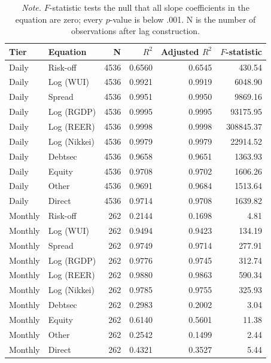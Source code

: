 \FloatBarrier
\begin{table}[H]
  \centering
  \caption{Per-Equation Fit Statistics, Restricted VAR, Paper Period}
  \label{tab:fit}
  \small
  \begin{tabular}{l l r r r r}
    \toprule
    Tier & Equation & N & $R^2$ & Adjusted $R^2$ & $F$-statistic \\
    \midrule
    Daily & Risk-off & 4536 & 0.6560 & 0.6545 & 430.54 \\
    Daily & Log (WUI) & 4536 & 0.9921 & 0.9919 & 6048.90 \\
    Daily & Spread & 4536 & 0.9951 & 0.9950 & 9869.16 \\
    Daily & Log (RGDP) & 4536 & 0.9995 & 0.9995 & 93175.95 \\
    Daily & Log (REER) & 4536 & 0.9998 & 0.9998 & 308845.37 \\
    Daily & Log (Nikkei) & 4536 & 0.9979 & 0.9979 & 22914.52 \\
    Daily & Debtsec & 4536 & 0.9658 & 0.9651 & 1363.93 \\
    Daily & Equity & 4536 & 0.9708 & 0.9702 & 1606.26 \\
    Daily & Other & 4536 & 0.9691 & 0.9684 & 1513.64 \\
    Daily & Direct & 4536 & 0.9714 & 0.9708 & 1639.82 \\
    \midrule
    Monthly & Risk-off & 262 & 0.2144 & 0.1698 & 4.81 \\
    Monthly & Log (WUI) & 262 & 0.9494 & 0.9423 & 134.19 \\
    Monthly & Spread & 262 & 0.9749 & 0.9714 & 277.91 \\
    Monthly & Log (RGDP) & 262 & 0.9776 & 0.9745 & 312.74 \\
    Monthly & Log (REER) & 262 & 0.9880 & 0.9863 & 590.34 \\
    Monthly & Log (Nikkei) & 262 & 0.9785 & 0.9755 & 325.93 \\
    Monthly & Debtsec & 262 & 0.2983 & 0.2002 & 3.04 \\
    Monthly & Equity & 262 & 0.6140 & 0.5601 & 11.38 \\
    Monthly & Other & 262 & 0.2542 & 0.1499 & 2.44 \\
    Monthly & Direct & 262 & 0.4321 & 0.3527 & 5.44 \\
    \bottomrule
  \end{tabular}
  \caption*{\textit{Note.} $F$-statistic tests the null that all slope coefficients in the equation are zero; every $p$-value is below .001. N is the number of observations after lag construction.}
\end{table}
\FloatBarrier

